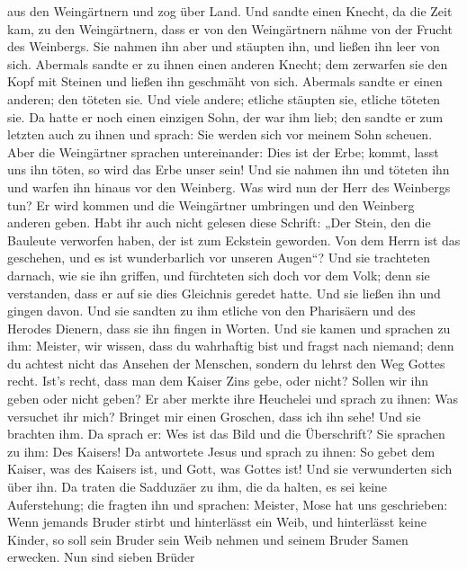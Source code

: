 aus den Weingärtnern und zog über Land.  Und sandte einen
Knecht, da die Zeit kam, zu den Weingärtnern, dass er von den
Weingärtnern nähme von der Frucht des Weinbergs.  Sie nahmen
ihn aber und stäupten ihn, und ließen ihn leer von sich. 
Abermals sandte er zu ihnen einen anderen Knecht; dem zerwarfen sie den
Kopf mit Steinen und ließen ihn geschmäht von sich. 
Abermals sandte er einen anderen; den töteten sie. Und viele andere;
etliche stäupten sie, etliche töteten sie.  Da hatte er noch
einen einzigen Sohn, der war ihm lieb; den sandte er zum letzten auch zu
ihnen und sprach: Sie werden sich vor meinem Sohn scheuen. 
Aber die Weingärtner sprachen untereinander: Dies ist der Erbe; kommt,
lasst uns ihn töten, so wird das Erbe unser sein!  Und sie
nahmen ihn und töteten ihn und warfen ihn hinaus vor den Weinberg.
 Was wird nun der Herr des Weinbergs tun? Er wird kommen und
die Weingärtner umbringen und den Weinberg anderen geben. 
Habt ihr auch nicht gelesen diese Schrift: „Der Stein, den die Bauleute
verworfen haben, der ist zum Eckstein geworden.  Von dem
Herrn ist das geschehen, und es ist wunderbarlich vor unseren Augen``?
 Und sie trachteten darnach, wie sie ihn griffen, und
fürchteten sich doch vor dem Volk; denn sie verstanden, dass er auf sie
dies Gleichnis geredet hatte. Und sie ließen ihn und gingen davon.
 Und sie sandten zu ihm etliche von den Pharisäern und des
Herodes Dienern, dass sie ihn fingen in Worten.  Und sie
kamen und sprachen zu ihm: Meister, wir wissen, dass du wahrhaftig bist
und fragst nach niemand; denn du achtest nicht das Ansehen der Menschen,
sondern du lehrst den Weg Gottes recht. Ist's recht, dass man dem Kaiser
Zins gebe, oder nicht? Sollen wir ihn geben oder nicht geben?
 Er aber merkte ihre Heuchelei und sprach zu ihnen: Was
versuchet ihr mich? Bringet mir einen Groschen, dass ich ihn sehe!
 Und sie brachten ihm. Da sprach er: Wes ist das Bild und
die Überschrift? Sie sprachen zu ihm: Des Kaisers!  Da
antwortete Jesus und sprach zu ihnen: So gebet dem Kaiser, was des
Kaisers ist, und Gott, was Gottes ist! Und sie verwunderten sich über
ihn.  Da traten die Sadduzäer zu ihm, die da halten, es sei
keine Auferstehung; die fragten ihn und sprachen:  Meister,
Mose hat uns geschrieben: Wenn jemands Bruder stirbt und hinterlässt ein
Weib, und hinterlässt keine Kinder, so soll sein Bruder sein Weib nehmen
und seinem Bruder Samen erwecken.  Nun sind sieben Brüder
